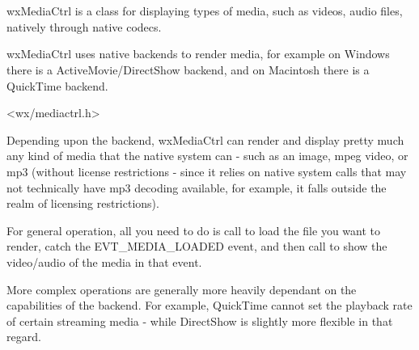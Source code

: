 
\section{}\label{wxmediactrl}

wxMediaCtrl is a class for displaying types of 
media, such as videos, audio files, natively through native codecs.

wxMediaCtrl uses native backends to render media, for example on Windows
there is a ActiveMovie/DirectShow backend, and on Macintosh there is a 
QuickTime backend.






<wx/mediactrl.h>





\label{renderingmediawxmediactrl}

Depending upon the backend, wxMediaCtrl can render
and display pretty much any kind of media that the native system can - 
such as an image, mpeg video, or mp3 (without license restrictions -
since it relies on native system calls that may not technically
have mp3 decoding available, for example, it falls outside the
realm of licensing restrictions).

For general operation, all you need to do is call 
 to load the file
you want to render, catch the EVT\_MEDIA\_LOADED event,
and then call  
to show the video/audio of the media in that event.

More complex operations are generally more heavily dependant on the
capabilities of the backend.  For example, QuickTime cannot set
the playback rate of certain streaming media - while DirectShow is 
slightly more flexible in that regard.



